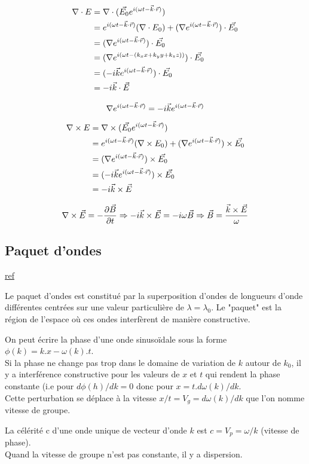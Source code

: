 \documentclass{article}
\begin{document}
$$
\begin{aligned}
\nabla \cdot E 
& = \nabla \cdot (\vec{E_0} e^{i(\omega t - \vec{k}\cdot \vec{r})}) \\
& = e^{i(\omega t - \vec{k}\cdot \vec{r})} (\nabla \cdot E_0) + (\nabla e^{i(\omega t - \vec{k}\cdot \vec{r})}) \cdot \vec{E_0}\\
& = (\nabla e^{i(\omega t - \vec{k}\cdot \vec{r})}) \cdot \vec{E_0}\\
& = (\nabla e^{i(\omega t - (k_x x + k_y y + k_z z))}) \cdot \vec{E_0}\\
& = (-i\vec{k}{e^{i(\omega t - \vec{k}\cdot \vec{r})}}) \cdot \vec{E_0}\\
& = -i\vec{k}\cdot \vec{E}
\end{aligned}
$$

$$
\nabla e^{i(\omega t - \vec{k} \cdot \vec{r})}
= -i\vec{k}{e^{i(\omega t - \vec{k}\cdot \vec{r})}}
$$

$$
\begin{aligned}
\nabla \times E 
& = \nabla \times (\vec{E_0} e^{i(\omega t - \vec{k}\cdot \vec{r})}) \\
& = e^{i(\omega t - \vec{k}\cdot \vec{r})} (\nabla \times E_0) + (\nabla e^{i(\omega t - \vec{k}\cdot \vec{r})}) \times \vec{E_0}\\
& = (\nabla e^{i(\omega t - \vec{k}\cdot \vec{r})}) \times \vec{E_0}\\
& = (-i\vec{k}{e^{i(\omega t - \vec{k}\cdot \vec{r})}}) \times \vec{E_0}\\
& = -i\vec{k}\times \vec{E}
\end{aligned}
$$

$$
\nabla \times \vec{E} = - \dfrac{\partial \vec{B}}{\partial t}
\Rightarrow
-i\vec{k} \times \vec{E} = -i \omega \vec{B}
\Rightarrow
\vec{B} = \dfrac{\vec{k} \times \vec{E}}{\omega}
$$

\subsection{Paquet d'ondes}
\href{http://ressources.univ-lemans.fr/AccesLibre/UM/Pedago/physique/02/divers/paquet2.html}{ref}

Le paquet d'ondes est constitu\'e par la superposition d'ondes de longueurs d'onde diff\'erentes centr\'ees sur une valeur particuli\`ere de $\lambda = \lambda_0$. Le "paquet" est la r\'egion de l'espace o\`u ces ondes interf\`erent de mani\`ere constructive.

On peut \'ecrire la phase d'une onde sinuso\"idale sous la forme $\phi(k) = k.x - \omega(k).t$.\\
Si la phase ne change pas trop dans le domaine de variation de $k$ autour de $k_0$, il y a interf\'erence constructive pour les valeurs de $x$ et $t$ qui rendent la phase constante (i.e pour $d\phi(h) / dk = 0$ donc pour $x = t.d\omega(k) / dk$.\\
Cette perturbation se d\'eplace \`a la vitesse $x / t  = V_g = d\omega(k) / dk$ que l'on nomme vitesse de groupe.

La c\'el\'erit\'e c d'une onde unique de vecteur d'onde $k$ est $c = V_p = \omega / k$ (vitesse de phase). \\
Quand la vitesse de groupe n'est pas constante, il y a dispersion.
\end{document}
